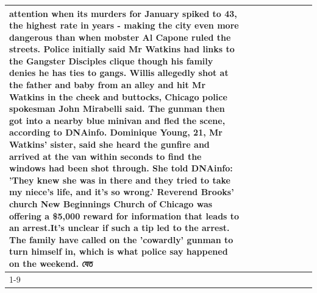 \begin{table}[H]
\begin{tabular}{lllrlllll}
attention when its murders for January spiked to 43, the highest rate in years - making the city even more dangerous than when mobster Al Capone ruled the streets. Police initially said Mr Watkins had links to the Gangster Disciples clique though his family denies he has ties to gangs. Willis allegedly shot at the father and baby from an alley and hit Mr Watkins in the cheek and buttocks, Chicago police spokesman John Mirabelli said. The gunman then got into a nearby blue minivan and fled the scene, according to DNAinfo. Dominique Young, 21, Mr Watkins' sister, said she heard the gunfire and arrived at the van within seconds to find the windows had been shot through. She told DNAinfo: 'They knew she was in there and they tried to take my niece's life, and it's so wrong.' Reverend Brooks' church New Beginnings Church of Chicago was offering a \$5,000 reward for information that leads to an arrest.It's unclear if such a tip led to the arrest. The family have called on the 'cowardly' gunman to turn himself in, which is what police say happened on the weekend. যেত \\
\cline{1-9}

\end{tabular}
\end{table}

